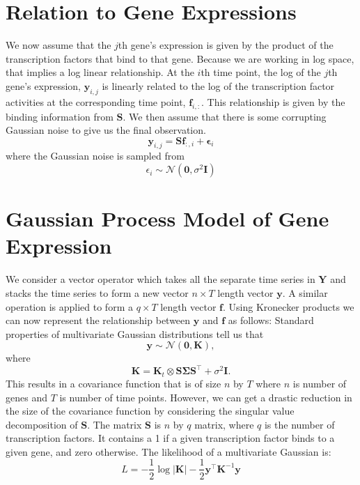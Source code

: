 \section{Relation to Gene Expressions}

We now assume that the $j$th gene's expression is given by the product of the transcription factors that bind to 
that gene. Because we are working in log space, that implies a log linear relationship. At the $i$th time point, 
the log of the $j$th gene's expression, $\mathbf{y}_{i,j}$ is linearly related to the log of the transcription 
factor activities at the corresponding time point, $\mathbf{f}_{i, :}$. This relationship is given by the binding 
information from $\mathbf{S}$. We then assume that there is some corrupting Gaussian noise to give us the final 
observation.
\begin{equation} \label{eq:yij}
  \mathbf{y}_{i, j} = \mathbf{S}\mathbf{f}_{:, i} + \boldsymbol{\epsilon}_i
\end{equation}  
where the Gaussian noise is sampled from
\begin{equation} \label{eq:epsi}
  \epsilon_i \sim \mathcal{N}(\mathbf{0}, \sigma^2 \mathbf{I})
\end{equation}

\section{Gaussian Process Model of Gene Expression}

We consider a vector operator which takes all the separate time series in $\mathbf{Y}$ and stacks the time series 
to form a new vector $n\times T$ length vector $\mathbf{y}$. A similar operation is applied to form a $q \times T$ 
length vector $\mathbf{f}$. Using Kronecker products we can now represent the relationship between $\mathbf{y}$ and 
$\mathbf{f}$ as follows:  
Standard properties of multivariate Gaussian distributions tell us that
\begin{equation} \label{eq:mGPd}
\mathbf{y} \sim \mathcal{N}(\mathbf{0}, \mathbf{K}),
\end{equation}
where
\begin{equation} \label{eq:K}
\mathbf{K} = \mathbf{K}_t \otimes \mathbf{S} \boldsymbol{\Sigma} \mathbf{S}^\top + \sigma^2 \mathbf{I}.
\end{equation}
This results in a covariance function that is of size $n$ by $T$ where $n$ is number of genes and $T$ is number of 
time points. However, we can get a drastic reduction in the size of the covariance function by considering 
the singular value decomposition of $\mathbf{S}$. 
The matrix $\mathbf{S}$ is $n$ by $q$ matrix, where $q$ is the number of transcription factors. It contains a 1 
if a given transcription factor binds to a given gene, and zero otherwise. 
The likelihood of a multivariate Gaussian is:
\begin{equation} \label{eq:Likelihood}
L = -\frac{1}{2} \log |\mathbf{K}| - \frac{1}{2} \mathbf{y}^\top \mathbf{K}^{-1} \mathbf{y}
\end{equation}

